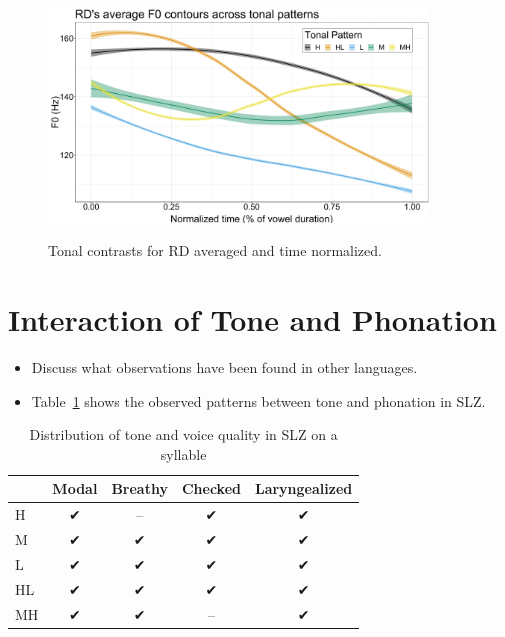 \documentclass[12pt, letterpaper]{article}
\providecommand{\lsptoprule}{\midrule\toprule}
\providecommand{\lspbottomrule}{\bottomrule\midrule}
\begin{document}
\begin{figure}[!ht]
	\centering
	\includegraphics[width=0.9\textwidth]{../RDTonePlot.png}
	\label{fig:RDTonePlot}
	\caption{Tonal contrasts for RD averaged and time normalized.}
\end{figure}




\section{Interaction of Tone and Phonation} \label{sec:Interaction}

\begin{itemize}
	\item Discuss what observations have been found in other languages. 
	\item Table~\ref{tab:ToneVoiceQuality} shows the observed patterns between tone and phonation in SLZ. 
\end{itemize}

\vspace{-20pt}
\begin{table}[!h]
	\caption{Distribution of tone and voice quality in SLZ on a syllable}
	\label{tab:ToneVoiceQuality}
	\centering

	\begin{tabular}{lcccc}
	\lsptoprule
		& \textbf{Modal} & \textbf{Breathy} & \textbf{Checked} & \textbf{Laryngealized} \\
	\hline
	H	& ✔ & -- & ✔ & ✔ \\
	M	& ✔ & ✔ & ✔ & ✔\\
	L	& ✔	& ✔ & ✔ & ✔\\
	HL	& ✔	& ✔ & ✔ & ✔\\
	MH	& ✔	& ✔ & -- & ✔ \\
	\lspbottomrule
	\end{tabular}
\end{table}
\end{document}
